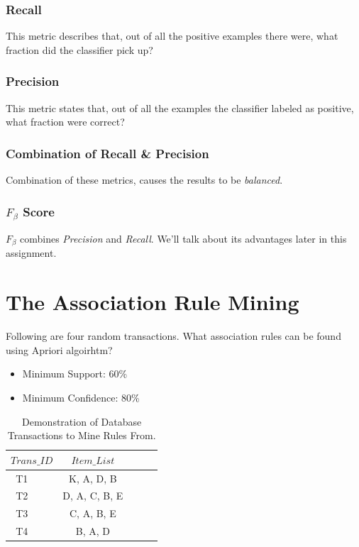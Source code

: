 \documentclass[12pt]{article}
\numberwithin{equation}{section}
\numberwithin{table}{section}
\numberwithin{figure}{section}
\begin{document}
\subsubsection*{Recall}
This metric describes that, out of all the positive examples there were, what fraction did the classifier pick up?

\subsubsection*{Precision}
This metric states that, out of all the examples the classifier labeled as positive, what fraction were correct?

\subsubsection*{Combination of Recall \& Precision}
Combination of these metrics, causes the results to be \textit{balanced}.

\subsubsection*{$F_{\beta}$ Score}
$F_{\beta}$ combines \textit{Precision} and \textit{Recall}. We'll talk about its advantages later in this assignment.
\newpage

\section{The Association Rule Mining}
Following are four random transactions. What association rules can be found using Apriori algoirhtm?
\begin{itemize}
	\item Minimum Support: 60\%
	\item Minimum Confidence: 80\%
\end{itemize}
\begin{table}[!h] \centering
	\begin{tabular}{rcccc}
		\hline
		$ Trans\_ID $ &
		$ Item\_List $ \\
		\hline
		 T1\ \ \ \ \ & {K, A, D, B} \\
		 T2\ \ \ \ \ & {D, A, C, B, E} \\
		 T3\ \ \ \ \  & {C, A, B, E} \\
		 T4\ \ \ \ \ & {B, A, D} \\
		\hline
	\end{tabular}
	\caption{Demonstration of Database Transactions to Mine Rules From.}
	\label{tabconvdemo}
\end{table}
\end{document}
